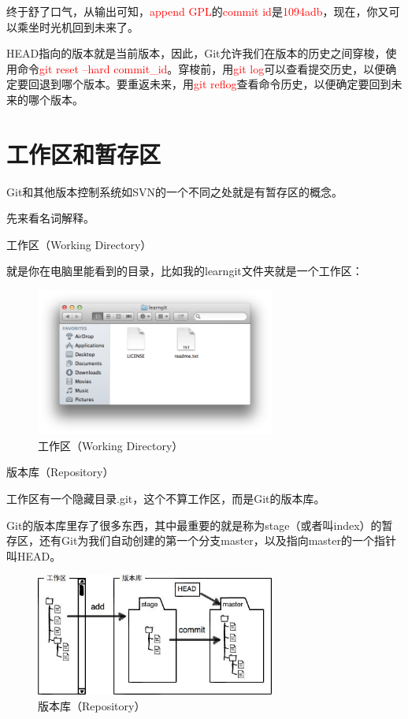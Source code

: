 终于舒了口气，从输出可知，\textcolor{red}{append GPL}的\textcolor{red}{commit id}是\textcolor{red}{1094adb}，现在，你又可以乘坐时光机回到未来了。

\begin{tcolorbox}

HEAD指向的版本就是当前版本，因此，Git允许我们在版本的历史之间穿梭，使用命令\textcolor{red}{git reset --hard commit\_id}。穿梭前，用\textcolor{red}{git log}可以查看提交历史，以便确定要回退到哪个版本。要重返未来，用\textcolor{red}{git reflog}查看命令历史，以便确定要回到未来的哪个版本。
\end{tcolorbox}

\section{工作区和暂存区}
Git和其他版本控制系统如SVN的一个不同之处就是有暂存区的概念。

先来看名词解释。

工作区（Working Directory）

就是你在电脑里能看到的目录，比如我的learngit文件夹就是一个工作区：

\begin{figure}[h]
    \centering
    \includegraphics[width=0.7\textwidth]{img/working-dir.png}
    \caption{工作区（Working Directory）}
    \label{fig:mesh1}
\end{figure}


版本库（Repository）

工作区有一个隐藏目录.git，这个不算工作区，而是Git的版本库。

Git的版本库里存了很多东西，其中最重要的就是称为stage（或者叫index）的暂存区，还有Git为我们自动创建的第一个分支master，以及指向master的一个指针叫HEAD。

\begin{figure}[h]
    \centering
    \includegraphics[width=0.7\textwidth]{img/git-repo.jpg}
    \caption{版本库（Repository）}
    \label{fig:mesh1}
\end{figure}

